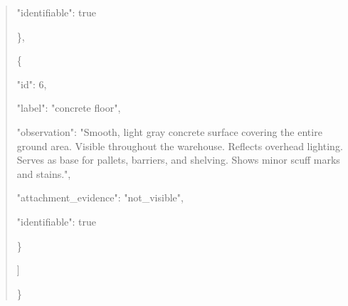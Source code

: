 \documentclass[10pt,a4paper]{article}
\begin{document}
\begin{quote}
      "identifiable":\allowbreak{} true\par
    \},\allowbreak{}\par
    \{\par
      "id":\allowbreak{} 6,\allowbreak{}\par
      "label":\allowbreak{} "concrete floor",\allowbreak{}\par
      "observation":\allowbreak{} "Smooth,\allowbreak{} light gray concrete surface covering the entire ground area. Visible throughout the warehouse. Reflects overhead lighting. Serves as base for pallets,\allowbreak{} barriers,\allowbreak{} and shelving. Shows minor scuff marks and stains.",\allowbreak{}\par
      "attachment\_evidence":\allowbreak{} "not\_visible",\allowbreak{}\par
      "identifiable":\allowbreak{} true\par
    \}\par
  ]\par
\}
\end{quote}
\end{document}
